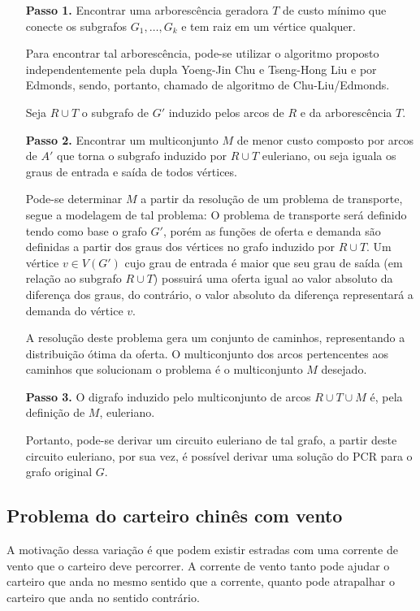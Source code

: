 \documentclass[12pt, a4paper]{article}
\begin{document}
	\begin{enumerate}
        \item[\textbf{Passo 1.}] 
			Encontrar uma arborescência geradora $T$ de custo mínimo que conecte os subgrafos $G_1, \dots, G_k$ e tem raiz em um vértice qualquer.

            Para encontrar tal arborescência, pode-se utilizar o algoritmo proposto independentemente pela dupla Yoeng-Jin Chu e Tseng-Hong Liu e por Edmonds\cite{edmonds-ssa}, sendo, portanto, chamado de algoritmo de Chu-Liu/Edmonds.

			Seja $R \cup T$ o subgrafo de $G'$ induzido pelos arcos de $R$ e da arborescência $T$.

        \item[\textbf{Passo 2.}]
            Encontrar um multiconjunto $M$ de menor custo composto por arcos de $A'$ que torna o subgrafo induzido por $R \cup T$ euleriano, ou seja iguala os graus de entrada e saída de todos vértices.

			Pode-se determinar $M$ a partir da resolução de um problema de transporte, segue a modelagem de tal problema: 
            O problema de transporte será definido tendo como base o grafo $G'$, porém as funções de oferta e demanda são definidas a partir dos graus dos vértices no grafo induzido por $R \cup T$.
            Um vértice $v \in V(G')$ cujo grau de entrada é maior que seu grau de saída (em relação ao subgrafo $R \cup T$) possuirá uma oferta igual ao valor absoluto da diferença dos graus, do contrário, o valor absoluto da diferença representará a demanda do vértice $v$.

			A resolução deste problema gera um conjunto de caminhos, representando a distribuição ótima da oferta. O multiconjunto dos arcos pertencentes aos caminhos que solucionam o problema é o multiconjunto $M$ desejado.

        \item[\textbf{Passo 3.}]
			O digrafo induzido pelo multiconjunto de arcos $R \cup T \cup M$ é, pela definição de $M$, euleriano. 
			
			Portanto, pode-se derivar um circuito euleriano de tal grafo, a partir deste circuito euleriano, por sua vez, é possível derivar uma solução do PCR para o grafo original $G$.
	\end{enumerate}

    \subsection{Problema do carteiro chinês com vento}
        A motivação dessa variação é que podem existir estradas com uma corrente de vento que o carteiro deve percorrer. A corrente de vento tanto pode ajudar o carteiro que anda no mesmo sentido que a corrente, quanto pode atrapalhar o carteiro que anda no sentido contrário.
\end{document}
